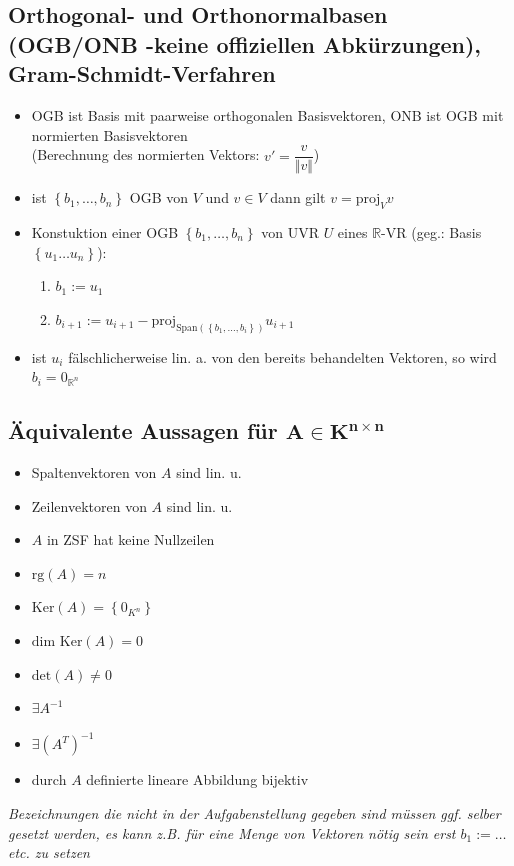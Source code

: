\documentclass[10pt,a4paper]{article}
\begin{document}
\subsection{Orthogonal- und Orthonormalbasen (OGB/ONB -keine offiziellen Abkürzungen), Gram-Schmidt-Verfahren }
\begin{itemize}
\item OGB ist Basis mit paarweise orthogonalen Basisvektoren, ONB ist OGB mit normierten Basisvektoren\\
(Berechnung des normierten Vektors: $v'=\dfrac{v}{\Vert v\Vert}$)
\item ist $\left\lbrace b_{1},\dotsc, b_{n}\right\rbrace$ OGB von $V$ und $v\in V$ dann gilt $v=\text{proj}_{V}v$
\item Konstuktion einer OGB $\left\lbrace b_{1},\dotsc, b_{n}\right\rbrace$ von UVR $U$ eines $\mathbb{R}$-VR (geg.: Basis $\left\lbrace u_{1} \dotsc u_{n}\right\rbrace$):
\begin{enumerate}
\item $b_{1}:=u_{1}$
\item $b_{i+1}:=u_{i+1}-\text{proj}_{\text{Span}(\left\lbrace b_{1},\dotsc,b_{i}\right\rbrace)}u_{i+1}$
\end{enumerate}
\item ist $u_{i}$ fälschlicherweise lin. a. von den bereits behandelten Vektoren, so wird $b_{i}=0_{\mathbb{R}^{n}}$
\end{itemize}



\subsection{Äquivalente Aussagen für $\boldsymbol{A\in K^{n\times n}}$}
\begin{itemize}
\item Spaltenvektoren von $A$ sind lin. u. 
\item Zeilenvektoren von $A$ sind lin. u.
\item $A$ in ZSF hat keine Nullzeilen 
\item $\text{rg}(A)= n $
\item $\text{Ker}(A)=\left\lbrace 0_{K^{n}}\right\rbrace$
\item $\text{dim Ker}(A)=0$
\item $\text{det}(A)\neq 0$
\item $\exists A^{-1}$ 
\item $\exists (A^{T})^{-1}$
\item durch $A$ definierte lineare Abbildung bijektiv
\end{itemize}
\noindent \textit{Bezeichnungen die nicht in der Aufgabenstellung gegeben sind müssen ggf. selber gesetzt werden, es kann z.B. für eine Menge von Vektoren nötig sein erst $b_{1}:=\dotsc$ etc. zu setzen}
\end{document}
